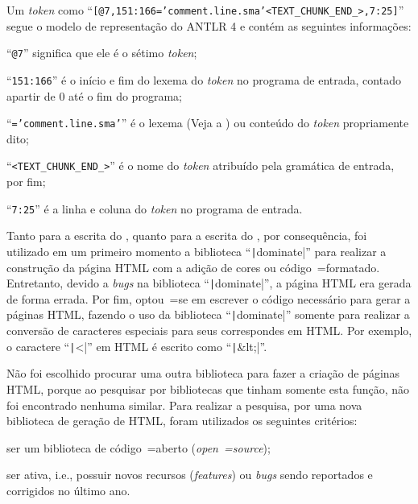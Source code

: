 Um \textit{token} como ``\texttt{[@7,151:166='comment.line.sma'<TEXT_CHUNK_END_>,7:25]}'' segue o modelo de representação do ANTLR 4 \cite{antlrBookTerrentParr} e
contém as seguintes informações:
\begin{inparaenum}[1)]
\item ``\texttt{@7}'' significa que ele é o sétimo \textit{token};
\item ``\texttt{151:166}'' é o início e
fim do lexema do \textit{token} no programa de entrada,
contado apartir de 0 até o fim do programa;
\item ``\texttt{='comment.line.sma'}'' é o lexema (Veja a ) ou
conteúdo do \textit{token} propriamente dito;
\item ``\texttt{<TEXT_CHUNK_END_>}'' é o nome do \textit{token} atribuído pela gramática de entrada,
por fim;
\item ``\texttt{7:25}'' é a linha e
coluna do \textit{token} no programa de entrada.
\end{inparaenum}%

Tanto para a escrita do ,
quanto para a escrita do ,
por consequência,
foi utilizado em um primeiro momento a biblioteca ``\texttt|dominate|'' para realizar a construção da página HTML com a adição de cores ou
código~=formatado. Entretanto,
devido a \textit{bugs} na biblioteca ``\texttt|dominate|'',
a página HTML era gerada de forma errada.
Por fim,
optou~=se em escrever o código necessário para gerar a páginas HTML,
fazendo o uso da biblioteca ``\texttt|dominate|'' somente para realizar a conversão de caracteres especiais para seus correspondes em HTML.
Por exemplo,
o caractere ``\texttt|<|'' em HTML é escrito como ``\texttt|&lt;|''.

Não foi escolhido procurar uma outra biblioteca para fazer a criação de páginas HTML,
porque ao pesquisar por bibliotecas que tinham somente esta função,
não foi encontrado nenhuma similar.
Para realizar a pesquisa,
por uma nova biblioteca de geração de HTML,
foram utilizados os seguintes critérios:
\begin{inparaenum}[1)]
\item ser um biblioteca de código~=aberto (\textit{open~=source});
\item ser ativa,
i.e.,
possuir novos recursos (\textit{features}) ou
\textit{bugs} sendo reportados e
corrigidos no último ano.
\end{inparaenum}%

